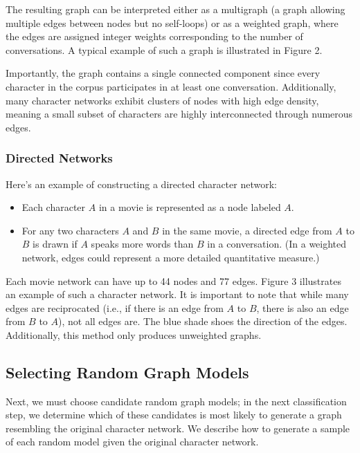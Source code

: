 \documentclass{article} %
\begin{document}
The resulting graph can be interpreted either as a multigraph (a graph allowing multiple edges between nodes but no self-loops) or as a weighted graph, where the edges are assigned integer weights corresponding to the number of conversations. A typical example of such a graph is illustrated in Figure 2.  

Importantly, the graph contains a single connected component since every character in the corpus participates in at least one conversation. Additionally, many character networks exhibit clusters of nodes with high edge density, meaning a small subset of characters are highly interconnected through numerous edges.

\subsubsection{Directed Networks}

Here’s an example of constructing a directed character network: \begin{itemize}
    \item Each character \( A \) in a movie is represented as a node labeled \( A \).  
    \item For any two characters \( A \) and \( B \) in the same movie, a directed edge from \( A \) to \( B \) is drawn if \( A \) speaks more words than \( B \) in a conversation. (In a weighted network, edges could represent a more detailed quantitative measure.)  
\end{itemize} 

Each movie network can have up to 44 nodes and 77 edges. Figure 3 illustrates an example of such a character network. It is important to note that while many edges are reciprocated (i.e., if there is an edge from \( A \) to \( B \), there is also an edge from \( B \) to \( A \)), not all edges are. The blue shade shoes the direction of the edges. Additionally, this method only produces unweighted graphs.

\subsection{Selecting Random Graph Models}

Next, we must choose candidate random graph models; in the next classification step, we determine which of these candidates is most likely to generate a graph resembling the original character network. We describe how to generate a sample of each random model given the original character network.
\end{document}
